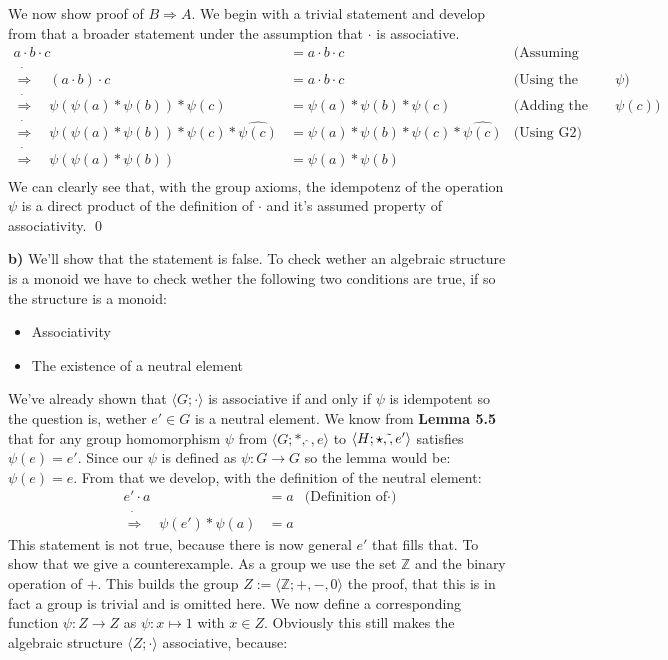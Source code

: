 \documentclass{article}
\begin{document}
We now show proof of $B \Rightarrow A$.
We begin with a trivial statement and develop from that a broader statement under the assumption that $\cdot$ is associative.
\begin{align*}
a\cdot b\cdot c&=a\cdot b\cdot c & \text{(Assuming associativity.)} \\
\dot\Rightarrow\quad   ( a \cdot b ) \cdot c &= a \cdot  b \cdot c  & \text{(Using the definition of} \: \psi \text{)} \\
\dot\Rightarrow\quad   \psi(\psi(a) * \psi(b)) * \psi(c) &= \psi(a) * \psi(b) * \psi(c) & \text{(Adding the inverse of} \: \psi(c) \text{)} \\
\dot\Rightarrow\quad \psi(\psi(a) * \psi(b)) * \psi(c) * \widehat{\psi(c)} &= \psi(a) * \psi(b) * \psi(c) * \widehat{\psi(c)} & \text{(Using G2)} \\
\dot\Rightarrow\quad \psi(\psi(a) * \psi(b)) &= \psi(a) * \psi(b) \\
\end{align*}
We can clearly see that, with the group axioms, the idempotenz of the operation $\psi$ is a direct product of the definition of $\cdot$ and it's assumed property of associativity. \qed

\break
\textbf{b)} We'll show that the statement is false.
To check wether an algebraic structure is a monoid we have to check wether the following two conditions are true, if so the structure is a monoid:
\begin{itemize}
    \item Associativity
    \item The existence of a neutral element
\end{itemize}

We've already shown that $\langle G; \cdot \rangle$ is associative if and only if $\psi$ is idempotent so the question is, wether $e' \in G$ is a neutral element. We know from \textbf{Lemma 5.5} that for any group homomorphism $\psi$ from $\langle G ; *, \hat{\:}, e\rangle$ to $\langle H; \star, \Tilde{}, e'\rangle$ satisfies $\psi(e) = e'$. Since our $\psi$ is defined as $\psi : G \rightarrow G$ so the lemma would be: $\psi(e) = e$. From that we develop, with the definition of the neutral element:
\begin{align*}
    e' \cdot a &= a  &\text{(Definition of} \cdot \text{)} \\
    \dot\Rightarrow\quad \psi(e') * \psi(a) &= a
\end{align*}
This statement is not true, because there is now general $e'$ that fills that. To show that we give a counterexample. As a group we use the set $\mathbb{Z}$ and the binary operation of $+$. This builds the group $Z := \langle \mathbb{Z}; +,-,0\rangle$ the proof, that this is in fact a group is trivial and is omitted here. We now define a corresponding function $\psi : Z \to Z$ as $\psi : x \mapsto 1$ with $x \in Z$. Obviously this still makes the algebraic structure $\langle Z; \cdot \rangle$ associative, because:
\end{document}
